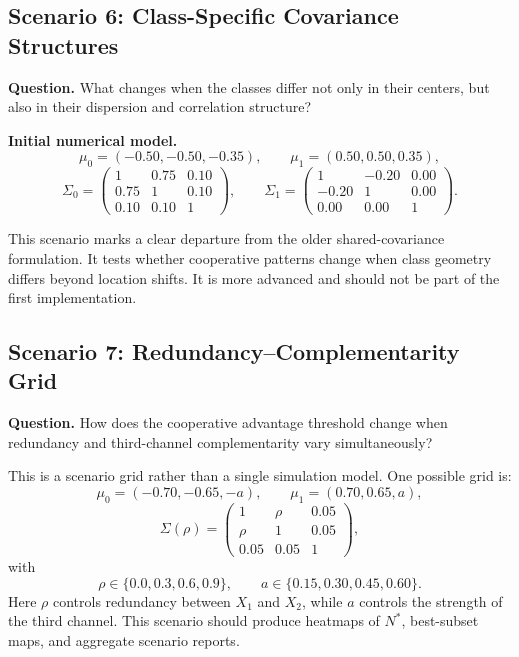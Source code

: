\documentclass[11pt,a4paper]{article}
\begin{document}
\subsection{Scenario 6: Class-Specific Covariance Structures}

\textbf{Question.} What changes when the classes differ not only in their centers, but also in their dispersion and correlation structure?

\textbf{Initial numerical model.}
\[
    \mu_0=(-0.50,-0.50,-0.35),
    \qquad
    \mu_1=(0.50,0.50,0.35),
\]
\[
\Sigma_0=
\begin{pmatrix}
1 & 0.75 & 0.10\\
0.75 & 1 & 0.10\\
0.10 & 0.10 & 1
\end{pmatrix},
\qquad
\Sigma_1=
\begin{pmatrix}
1 & -0.20 & 0.00\\
-0.20 & 1 & 0.00\\
0.00 & 0.00 & 1
\end{pmatrix}.
\]

This scenario marks a clear departure from the older shared-covariance formulation. It tests whether cooperative patterns change when class geometry differs beyond location shifts. It is more advanced and should not be part of the first implementation.

\subsection{Scenario 7: Redundancy--Complementarity Grid}

\textbf{Question.} How does the cooperative advantage threshold change when redundancy and third-channel complementarity vary simultaneously?

This is a scenario grid rather than a single simulation model. One possible grid is:
\[
    \mu_0=(-0.70,-0.65,-a),
    \qquad
    \mu_1=(0.70,0.65,a),
\]
\[
\Sigma(\rho)=
\begin{pmatrix}
1 & \rho & 0.05\\
\rho & 1 & 0.05\\
0.05 & 0.05 & 1
\end{pmatrix},
\]
with
\[
    \rho\in\{0.0,0.3,0.6,0.9\},
    \qquad
    a\in\{0.15,0.30,0.45,0.60\}.
\]
Here $\rho$ controls redundancy between $X_1$ and $X_2$, while $a$ controls the strength of the third channel. This scenario should produce heatmaps of $N^*$, best-subset maps, and aggregate scenario reports.
\end{document}
